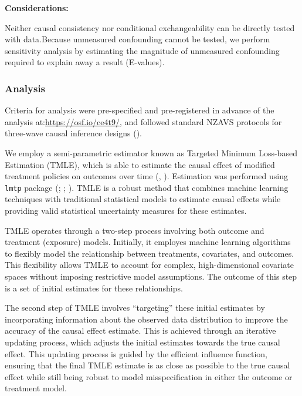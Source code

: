 \documentclass[
  singlecolumn]{article}
\begin{document}
\textbf{Considerations:}

Neither causal consistency nor conditional exchangeability can be
directly tested with data.Because unmeasured confounding cannot be
tested, we perform sensitivity analysis by estimating the magnitude of
unmeasured confounding required to explain away a result (E-values).

\subsubsection{Analysis}\label{analysis}

Criteria for analysis were pre-specified and pre-registered in advance
of the analysis at:\url{https://osf.io/ce4t9/}, and followed standard
NZAVS protocols for three-wave causal inference designs
().

We employ a semi-parametric estimator known as Targeted Minimum
Loss-based Estimation (TMLE), which is able to estimate the causal
effect of modified treatment policies on outcomes over time
(,
). Estimation was performed using
\texttt{lmtp} package (; ;
). TMLE is a robust
method that combines machine learning techniques with traditional
statistical models to estimate causal effects while providing valid
statistical uncertainty measures for these estimates.

TMLE operates through a two-step process involving both outcome and
treatment (exposure) models. Initially, it employes machine learning
algorithms to flexibly model the relationship between treatments,
covariates, and outcomes. This flexibility allows TMLE to account for
complex, high-dimensional covariate spaces without imposing restrictive
model assumptions. The outcome of this step is a set of initial
estimates for these relationships.

The second step of TMLE involves ``targeting'' these initial estimates
by incorporating information about the observed data distribution to
improve the accuracy of the causal effect estimate. This is achieved
through an iterative updating process, which adjusts the initial
estimates towards the true causal effect. This updating process is
guided by the efficient influence function, ensuring that the final TMLE
estimate is as close as possible to the true causal effect while still
being robust to model misspecification in either the outcome or
treatment model.
\end{document}
